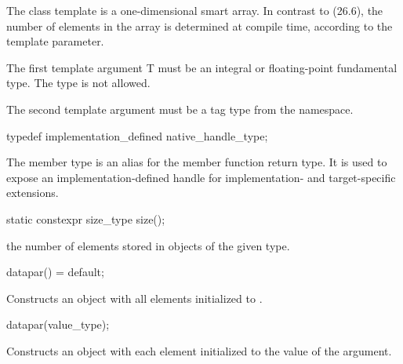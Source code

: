 

\pnum The class template \datapar{} is a one-dimensional smart array.
In contrast to  (26.6), the number of elements in the array is determined at compile time, according to the  template parameter.

\pnum The first template argument \type T must be an integral or floating-point fundamental type.
The type \bool is not allowed.

\pnum The second template argument  must be a tag type from the  namespace.

\begin{itemdecl}
typedef implementation_defined native_handle_type;
\end{itemdecl}
\begin{itemdescr}
  \pnum
  The  member type is an alias for the  member function return type.
  It is used to expose an implementation-defined handle for implementation- and target-specific extensions.
\end{itemdescr}


\begin{itemdecl}
static constexpr size_type size();
\end{itemdecl}
\begin{itemdescr}
  \pnum\returns the number of elements stored in objects of the given \datapar[<T, Abi>] type.
\end{itemdescr}

\begin{itemdecl}
datapar() = default;
\end{itemdecl}
\begin{itemdescr}
  \pnum
  \effects
  Constructs an object with all elements initialized to .
\end{itemdescr}

\begin{itemdecl}
datapar(value_type);
\end{itemdecl}
\begin{itemdescr}
  \pnum
  \effects
  Constructs an object with each element initialized to the value of the argument.
\end{itemdescr}

